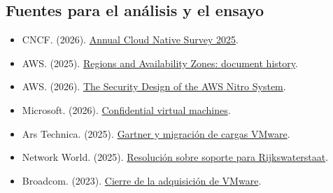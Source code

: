 \subsection{Fuentes para el análisis y el ensayo}
\begin{itemize}
\item CNCF. (2026). \href{https://www.cncf.io/wp-content/uploads/2026/01/CNCF_Annual_Survey_Report_final.pdf}{Annual Cloud Native Survey 2025}.
\item AWS. (2025). \href{https://docs.aws.amazon.com/global-infrastructure/latest/regions/doc-history.html}{Regions and Availability Zones: document history}.
\item AWS. (2026). \href{https://docs.aws.amazon.com/pdfs/whitepapers/latest/security-design-of-aws-nitro-system/security-design-of-aws-nitro-system.pdf}{The Security Design of the AWS Nitro System}.
\item Microsoft. (2026). \href{https://learn.microsoft.com/en-us/azure/confidential-computing/confidential-vm-overview}{Confidential virtual machines}.
\item Ars Technica. (2025). \href{https://arstechnica.com/information-technology/2025/09/35-percent-of-vmware-workloads-expected-to-migrate-elsewhere-by-2028/}{Gartner y migración de cargas VMware}.
\item Network World. (2025). \href{https://www.networkworld.com/article/4015489/dutch-court-forces-broadcom-to-support-vmware-migration-after-85-price-hike-backlash.html}{Resolución sobre soporte para Rijkswaterstaat}.
\item Broadcom. (2023). \href{https://investors.broadcom.com/news-releases/news-release-details/broadcom-completes-acquisition-vmware}{Cierre de la adquisición de VMware}.
\end{itemize}
